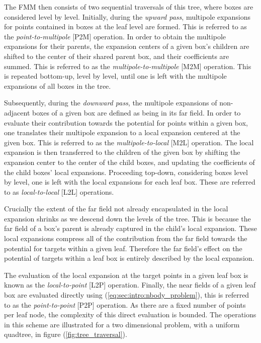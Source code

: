 \documentclass{IEEEcsmag}
\begin{document}
The FMM then consists of two sequential traversals of this tree, where boxes are considered level by level. Initially, during the \textit{upward pass}, multipole expansions for points contained in boxes at the leaf level are formed. This is referred to as the \textit{point-to-multipole} [P2M] operation. In order to obtain the multipole expansions for their parents, the expansion centers of a given box's children are shifted to the center of their shared parent box, and their coefficients are summed. This is referred to as the \textit{multipole-to-multipole} [M2M] operation. This is repeated bottom-up, level by level, until one is left with the multipole expansions of all boxes in the tree.

Subsequently, during the \textit{downward pass}, the multipole expansions of non-adjacent boxes of a given box are defined as being in its far field. In order to evaluate their contribution towards the potential for points within a given box, one translates their multipole expansion to a local expansion centered at the given box. This is referred to as the \textit{multipole-to-local} [M2L] operation. The local expansion is then transferred to the children of the given box by shifting the expansion center to the center of the child boxes, and updating the coefficients of the child boxes' local expansions. Proceeding top-down, considering boxes level by level, one is left with the local expansions for each leaf box. These are referred to as \textit{local-to-local} [L2L] operations.

Crucially the extent of the far field not already encapsulated in the local expansion shrinks as we descend down the levels of the tree. This is because the far field of a box's parent is already captured in the child's local expansion. These local expansions compress all of the contribution from the far field towards the potential for targets within a given leaf. Therefore the far field's effect on the potential of targets within a leaf box is entirely described by the local expansion.

The evaluation of the local expansion at the target points in a given leaf box is known as the \textit{local-to-point} [L2P] operation. Finally, the near fields of a given leaf box are evaluated directly using (\ref{eq:sec:intro:nbody_problem}), this is referred to as the \textit{point-to-point} [P2P] operation. As there are a fixed number of points per leaf node, the complexity of this direct evaluation is bounded. The operations in this scheme are illustrated for a two dimensional problem, with a uniform quadtree, in figure (\ref{fig:tree_traversal}).
\end{document}
